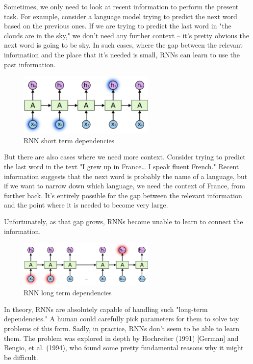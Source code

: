 {Sometimes, we only need to look at recent information to perform the present task. For example, consider a language model trying to predict the next word based on the previous ones. If we are trying to predict the last word in "the clouds are in the sky," we don’t need any further context – it’s pretty obvious the next word is going to be sky. In such cases, where the gap between the relevant information and the place that it’s needed is small, RNNs can learn to use the past information.
\renewcommand{\figurename}{Abb.}
\begin{figure}[htp]
\centering
\includegraphics[width=0.60\textwidth]{pictures/RNN-shorttermdepdencies.png}
\caption[RNN short term dependencies]{RNN short term dependencies\protect\footnotemark}
\end{figure}
But there are also cases where we need more context. Consider trying to predict the last word in the text "I grew up in France… I speak fluent French." Recent information suggests that the next word is probably the name of a language, but if we want to narrow down which language, we need the context of France, from further back. It’s entirely possible for the gap between the relevant information and the point where it is needed to become very large.

Unfortunately, as that gap grows, RNNs become unable to learn to connect the information.
\renewcommand{\figurename}{Abb.}
\begin{figure}[htp]
\centering
\includegraphics[width=0.60\textwidth]{pictures/RNN-longtermdependencies.png}
\caption[RNN long term dependencies]{RNN long term dependencies\protect\footnotemark}
\end{figure}
In theory, RNNs are absolutely capable of handling such "long-term dependencies." A human could carefully pick parameters for them to solve toy problems of this form. Sadly, in practice, RNNs don’t seem to be able to learn them. The problem was explored in depth by Hochreiter (1991) [German] and Bengio, et al. (1994), who found some pretty fundamental reasons why it might be difficult.

}
